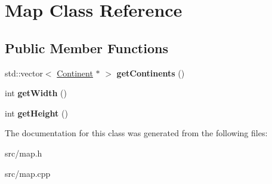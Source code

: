 \hypertarget{class_map}{}\section{Map Class Reference}
\label{class_map}
\subsection*{Public Member Functions}
\begin{DoxyCompactItemize}
\item 
\hypertarget{class_map_ad86eaa5a96061d9947535e2dd0177e2d}{}std\+::vector$<$ \hyperlink{class_continent}{Continent} $\ast$ $>$ {\bfseries get\+Continents} ()\label{class_map_ad86eaa5a96061d9947535e2dd0177e2d}

\item 
\hypertarget{class_map_afd34d12227676b3cebeed9f5fae2508f}{}int {\bfseries get\+Width} ()\label{class_map_afd34d12227676b3cebeed9f5fae2508f}

\item 
\hypertarget{class_map_a2b09c8875af2efb711fc3a022e70427d}{}int {\bfseries get\+Height} ()\label{class_map_a2b09c8875af2efb711fc3a022e70427d}

\end{DoxyCompactItemize}


The documentation for this class was generated from the following files\+:\begin{DoxyCompactItemize}
\item 
src/map.\+h\item 
src/map.\+cpp\end{DoxyCompactItemize}
